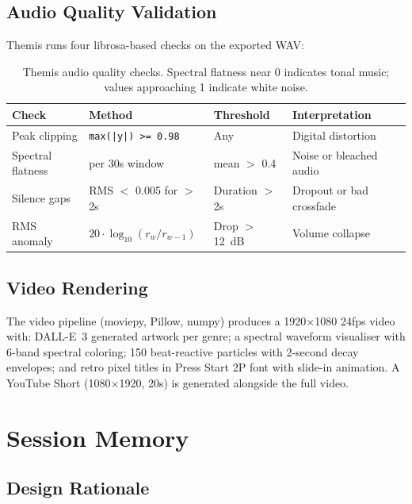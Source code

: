 \documentclass[11pt,a4paper]{article}
\begin{document}
\subsection{Audio Quality Validation}

Themis runs four librosa-based checks on the exported WAV:

\begin{table}[h]
\centering
\small
\begin{tabularx}{\linewidth}{@{}llXl@{}}
\toprule
\textbf{Check} & \textbf{Method} & \textbf{Threshold} & \textbf{Interpretation} \\
\midrule
Peak clipping & \texttt{max(|y|) >= 0.98} & Any & Digital distortion \\
Spectral flatness & per 30s window & mean $>$ 0.4 & Noise or bleached audio \\
Silence gaps & RMS $<$ 0.005 for $>$2s & Duration $>$2s & Dropout or bad crossfade \\
RMS anomaly & $20\cdot\log_{10}(r_w/r_{w-1})$ & Drop $>$12~dB & Volume collapse \\
\bottomrule
\end{tabularx}
\caption{Themis audio quality checks. Spectral flatness near 0 indicates
tonal music; values approaching 1 indicate white noise.}
\label{tab:validation}
\end{table}

\subsection{Video Rendering}

The video pipeline (moviepy, Pillow, numpy) produces a 1920$\times$1080
24fps video with: DALL-E~3 generated artwork per genre; a spectral waveform
visualiser with 6-band spectral coloring; 150 beat-reactive particles with
2-second decay envelopes; and retro pixel titles in Press Start 2P font with
slide-in animation. A YouTube Short (1080$\times$1920, 20s) is generated
alongside the full video.

\section{Session Memory}

\subsection{Design Rationale}
\end{document}
